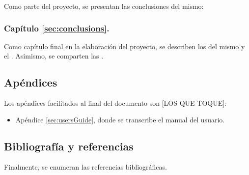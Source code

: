Como parte del proyecto, se presentan las conclusiones del mismo:

\subsubsection{Capítulo \ref{sec:conclusions}. }

\def \introConclusions {Como capítulo final en la elaboración del proyecto, se describen los \lnameref{sec:results} del mismo y el . Asimismo, se comparten las .}

\introConclusions

\subsection*{Apéndices}

Los apéndices facilitados al final del documento son [LOS QUE TOQUE]:

\begin{itemize}
    \item Apéndice \ref{sec:usersGuide}, donde se transcribe el manual del usuario.
\end{itemize}

\subsection*{Bibliografía y referencias}
Finalmente, se enumeran las referencias bibliográficas.